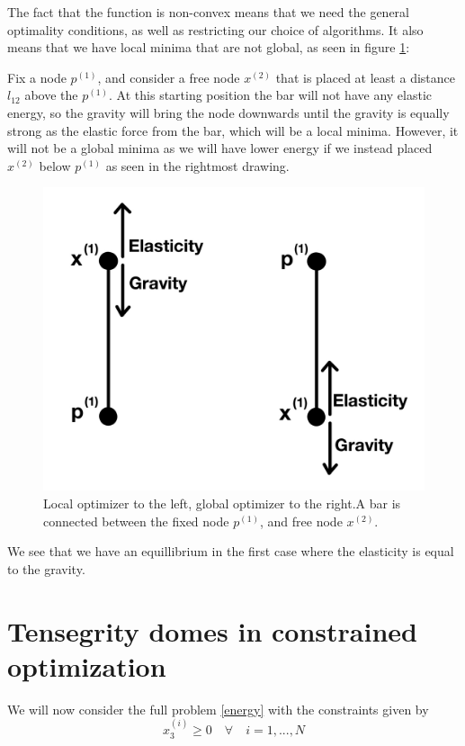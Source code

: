 The fact that the function is non-convex means that we need the general optimality conditions, as well as restricting our choice of algorithms. It also means that we have local minima that are not global, as seen in figure \ref{fig:local_optimizer}:

Fix a node $p^{(1)}$, and consider a free node $x^{(2)}$ that is placed at least a distance $l_{12}$ above the $p^{(1)}$. At this starting position the bar will not have any elastic energy, so the gravity will bring the node downwards until the gravity is equally strong as the elastic force from the bar, which will be a local minima. However, it will not be a global minima as we will have lower energy if we instead placed $x^{(2)}$ below $p^{(1)}$ as seen in the rightmost drawing. 

\begin{figure}
    \centering\includegraphics[width=0.5\columnwidth]{Bilder/local_optimizer.jpeg}
    \caption{Local optimizer to the left, global optimizer to the right.A bar is connected between the fixed node $p^{(1)}$, and free node $x^{(2)}$.}
    \label{fig:local_optimizer}
\end{figure}

We see that we have an equillibrium in the first case where the elasticity is equal to the gravity.

\section{Tensegrity domes in constrained optimization}
We will now consider the full problem \eqref{energy} with the constraints given by 
\begin{equation}
    x_3^{(i)} \geq 0 \quad \forall \quad i = 1,...,N
\end{equation}

